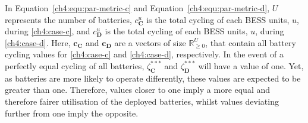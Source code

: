 


In Equation~\ref{ch4:equ:par-metric-c} and Equation~\ref{ch4:equ:par-metric-d}, $U$ represents the number of batteries, $c_\textbf{C}^u$ is the total cycling of each BESS units, $u$, during \ref{ch4:case-c}, and $c_\textbf{D}^u$ is the total cycling of each BESS units, $u$, during \ref{ch4:case-d}.
Here, $\textbf{c}_\textbf{C}$ and $\textbf{c}_\textbf{D}$ are a vectors of size $\mathbb{R}_{\geq 0}^{U}$, that contain all battery cycling values for \ref{ch4:case-c} and \ref{ch4:case-d}, respectively.
In the event of a perfectly equal cycling of all batteries, $\zeta^{***}_\textbf{C}$ and $\zeta^{***}_\textbf{D}$ will have a value of one.
Yet, as batteries are more likely to operate differently, these values are expected to be greater than one.
Therefore, values closer to one imply a more equal and therefore fairer utilisation of the deployed batteries, whilst values deviating further from one imply the opposite.


